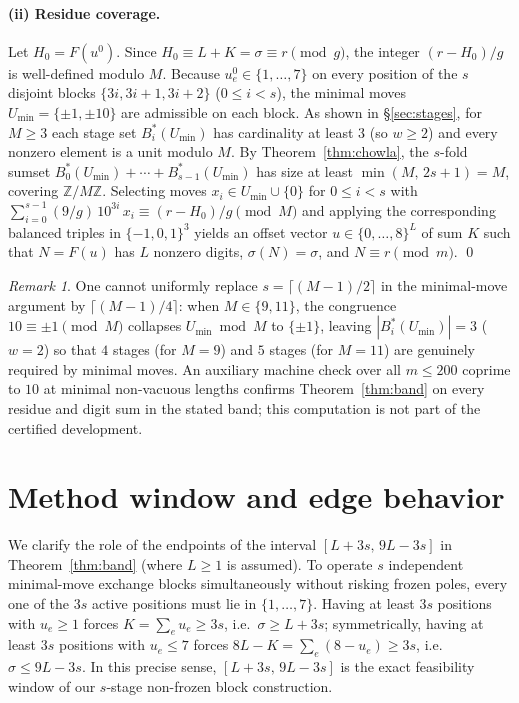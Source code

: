 \documentclass[11pt]{article}
\theoremstyle{remark}
\newtheorem{remark}[theorem]{Remark}
\newcommand{\Z}{\mathbb{Z}}
\newcommand{\sig}{\sigma}
\begin{document}
\paragraph{(ii) Residue coverage.} Let $H_0 = F(u^0)$. Since $H_0 \equiv L + K = \sig \equiv r \pmod g$,
the integer $(r - H_0)/g$ is well-defined modulo $M$. Because $u^0_e \in \{1,\dots,7\}$
on every position of the $s$ disjoint blocks $\{3i,3i+1,3i+2\}$ ($0 \le i < s$),
the minimal moves $U_{\min} = \{\pm 1, \pm 10\}$ are admissible on each block.
As shown in \S\ref{sec:stages}, for $M \ge 3$ each stage set $B^*_i(U_{\min})$
has cardinality at least $3$ (so $w \ge 2$) and every nonzero element is a unit
modulo $M$. By Theorem~\ref{thm:chowla}, the $s$-fold sumset
$B^*_0(U_{\min}) + \cdots + B^*_{s-1}(U_{\min})$ has size at least
$\min(M,\, 2s + 1) = M$, covering $\Z/M\Z$. Selecting moves $x_i \in U_{\min} \cup \{0\}$
for $0 \le i < s$ with $\sum_{i=0}^{s-1} (9/g)\,10^{3i}\,x_i \equiv (r - H_0)/g \pmod M$
and applying the corresponding balanced triples in $\{-1,0,1\}^3$ yields an
offset vector $u \in \{0,\dots,8\}^L$ of sum $K$ such that $N = F(u)$ has $L$
nonzero digits, $\sig(N) = \sig$, and $N \equiv r \pmod m$. \qed

\begin{remark}
One cannot uniformly replace $s = \lceil (M-1)/2 \rceil$ in the minimal-move
argument by $\lceil (M-1)/4 \rceil$: when $M \in \{9,11\}$, the congruence
$10 \equiv \pm 1 \pmod M$ collapses $U_{\min} \bmod M$ to $\{\pm 1\}$, leaving
$|B^*_i(U_{\min})| = 3$ ($w = 2$) so that $4$ stages (for $M = 9$) and $5$
stages (for $M = 11$) are genuinely required by minimal moves. An auxiliary
machine check over all $m \le 200$ coprime to $10$ at minimal non-vacuous
lengths confirms Theorem~\ref{thm:band} on every residue and digit sum in the
stated band; this computation is not part of the certified development.
\end{remark}

\section{Method window and edge behavior}
\label{sec:edges}

We clarify the role of the endpoints of the interval $[L+3s,\,9L-3s]$ in
Theorem~\ref{thm:band} (where $L \ge 1$ is assumed). To operate $s$ independent minimal-move exchange blocks
simultaneously without risking frozen poles, every one of the $3s$ active
positions must lie in $\{1,\dots,7\}$. Having at least $3s$ positions with
$u_e \ge 1$ forces $K = \sum_e u_e \ge 3s$, i.e.\ $\sig \ge L + 3s$;
symmetrically, having at least $3s$ positions with $u_e \le 7$ forces
$8L - K = \sum_e (8 - u_e) \ge 3s$, i.e.\ $\sig \le 9L - 3s$. In this precise
sense, $[L+3s,\,9L-3s]$ is the exact feasibility window of our $s$-stage
non-frozen block construction.
\end{document}
